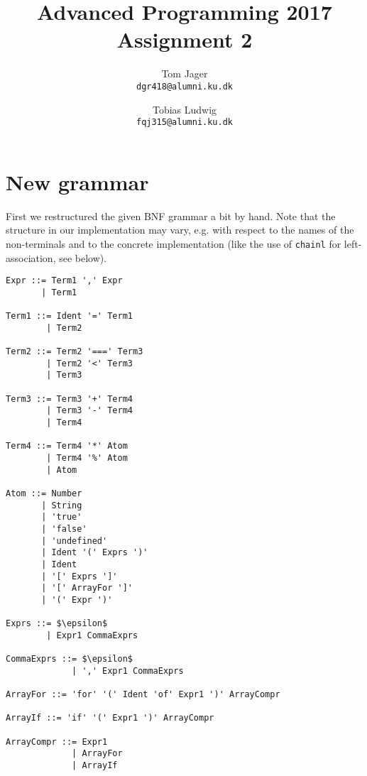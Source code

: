 \documentclass{article}
\title{Advanced Programming 2017\\Assignment 2}
\author{
Tom Jager\\
\texttt{dgr418@alumni.ku.dk}
\and
Tobias Ludwig\\
\texttt{fqj315@alumni.ku.dk}}
\begin{document}
\maketitle

\section{New grammar}

First we restructured the given BNF grammar a bit by hand.
Note that the structure in our implementation may vary, e.g. with respect to the names of the non-terminals and to the concrete implementation (like the use of \texttt{chainl} for left-association, see below).

\begin{lstlisting}[mathescape=true]
Expr ::= Term1 ',' Expr
       | Term1

Term1 ::= Ident '=' Term1
        | Term2

Term2 ::= Term2 '===' Term3
        | Term2 '<' Term3
        | Term3

Term3 ::= Term3 '+' Term4
        | Term3 '-' Term4
        | Term4

Term4 ::= Term4 '*' Atom
        | Term4 '%' Atom
        | Atom

Atom ::= Number
       | String
       | 'true'
       | 'false'
       | 'undefined'
       | Ident '(' Exprs ')'
       | Ident
       | '[' Exprs ']'
       | '[' ArrayFor ']'
       | '(' Expr ')'

Exprs ::= $\epsilon$
        | Expr1 CommaExprs

CommaExprs ::= $\epsilon$
             | ',' Expr1 CommaExprs

ArrayFor ::= 'for' '(' Ident 'of' Expr1 ')' ArrayCompr

ArrayIf ::= 'if' '(' Expr1 ')' ArrayCompr

ArrayCompr ::= Expr1
             | ArrayFor
             | ArrayIf
\end{lstlisting}
\end{document}
